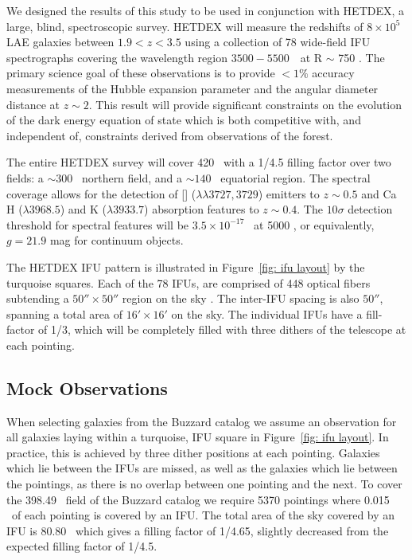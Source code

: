 \documentclass[fleqn,usenatbib]{mnras}
\begin{document}
We designed the results of this study to be used in conjunction with HETDEX, a large, blind, spectroscopic survey. HETDEX will measure the redshifts of $8 \times 10^5$ LAE galaxies between $1.9 < z < 3.5$ using a collection of 78 wide-field IFU spectrographs covering the wavelength region $3500 - 5500$~\AAA\ at R $\sim$ 750 \citep{Hill2008}. The primary science goal of these observations is to provide $<1\%$ accuracy measurements of the Hubble expansion parameter and the angular diameter distance at $z\sim2$. This result will provide significant constraints on the evolution of the dark energy equation of state which is both competitive with, and independent of, constraints derived from observations of the \lya forest.

The entire HETDEX survey will cover 420 \degsq\ with a 1/4.5 filling factor over two fields: a $\sim 300$ \degsq\ northern field, and a $\sim 140$ \degsq\ equatorial region. The spectral coverage allows for the detection of [] ($\lambda\lambda 3727,3729$) emitters to $z\sim 0.5$ and Ca H ($\lambda 3968.5$) and K ($\lambda 3933.7$) absorption features to $z\sim 0.4$. The $10 \sigma$ detection threshold for spectral features will be $3.5\times10^{-17}$ \ergscm\ at 5000 \AAA, or equivalently, $g = 21.9$ mag for continuum objects. 

The HETDEX IFU pattern is illustrated in Figure~\ref{fig: ifu layout} by the turquoise squares. Each of the 78 IFUs, are comprised of 448 optical fibers subtending a $50'' \times 50''$ region on the sky \citep{Kelz2014}. The inter-IFU spacing is also $50''$, spanning a total area of $16'\times 16'$ on the sky. The individual IFUs have a fill-factor of 1/3, which will be completely filled with three dithers of the telescope at each pointing.

\subsection{Mock Observations}\label{sec: observations}
When selecting galaxies from the Buzzard catalog we assume an observation for all galaxies laying within a turquoise, IFU square in Figure~\ref{fig: ifu layout}. In practice, this is achieved by three dither positions at each pointing. Galaxies which lie between the IFUs are missed, as well as the galaxies which lie between the pointings, as there is no overlap between one pointing and the next. To cover the 398.49 \degsq\ field of the Buzzard catalog we require 5370 pointings where 0.015 \degsq\ of each pointing is covered by an IFU. The total area of the sky covered by an IFU is 80.80 \degsq\ which gives a filling factor of 1/4.65, slightly decreased from the expected filling factor of 1/4.5.
\end{document}
